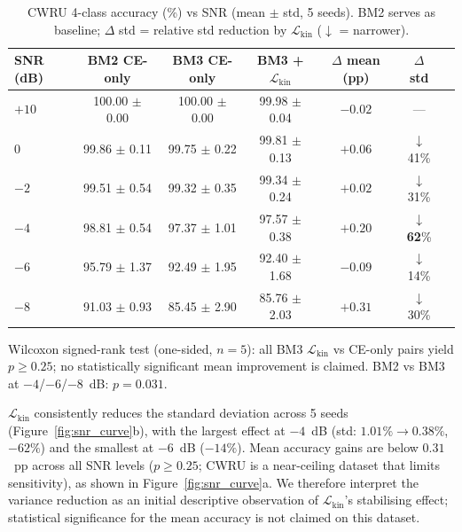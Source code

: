 \begin{table}[htbp]
\centering
\caption{CWRU 4-class accuracy (\%) vs SNR (mean $\pm$ std, 5 seeds).
         BM2 serves as baseline; $\Delta$ std = relative std reduction
         by $\mathcal{L}_{\text{kin}}$ ($\downarrow$ = narrower).}
\label{tab:snr_ablation}
\begin{tabular}{lcccccc}
\toprule
SNR (dB) &
  BM2 CE-only &
  BM3 CE-only &
  BM3 +$\mathcal{L}_{\text{kin}}$ &
  $\Delta$ mean (pp) &
  $\Delta$ std \\
\midrule
$+10$ & 100.00 $\pm$ 0.00 & 100.00 $\pm$ 0.00 & 99.98 $\pm$ 0.04 & $-0.02$ & --- \\
$0$   & 99.86 $\pm$ 0.11  & 99.75 $\pm$ 0.22  & 99.81 $\pm$ 0.13 & $+0.06$ & $\downarrow$41\% \\
$-2$  & 99.51 $\pm$ 0.54  & 99.32 $\pm$ 0.35  & 99.34 $\pm$ 0.24 & $+0.02$ & $\downarrow$31\% \\
$-4$  & 98.81 $\pm$ 0.54  & 97.37 $\pm$ 1.01  & 97.57 $\pm$ 0.38 & $+0.20$ & $\downarrow$\textbf{62}\% \\
$-6$  & 95.79 $\pm$ 1.37  & 92.49 $\pm$ 1.95  & 92.40 $\pm$ 1.68 & $-0.09$ & $\downarrow$14\% \\
$-8$  & 91.03 $\pm$ 0.93  & 85.45 $\pm$ 2.90  & 85.76 $\pm$ 2.03 & $+0.31$ & $\downarrow$30\% \\
\bottomrule
\end{tabular}
\begin{tablenotes}
\item Wilcoxon signed-rank test (one-sided, $n=5$): all BM3 $\mathcal{L}_{\text{kin}}$
      vs CE-only pairs yield $p \geq 0.25$; no statistically significant
      mean improvement is claimed.
      BM2 vs BM3 at $-4$/$-6$/$-8$~dB: $p = 0.031$.
\end{tablenotes}
\end{table}

$\mathcal{L}_{\text{kin}}$ consistently reduces the standard deviation across
5 seeds (Figure~\ref{fig:snr_curve}b), with the largest effect at $-4$~dB
(std: $1.01\% \to 0.38\%$, $-62\%$) and the smallest at $-6$~dB ($-14\%$).
Mean accuracy gains are below $0.31$~pp across all SNR levels ($p \geq 0.25$;
CWRU is a near-ceiling dataset that limits sensitivity), as shown in
Figure~\ref{fig:snr_curve}a.
We therefore interpret the variance reduction as an initial descriptive
observation of $\mathcal{L}_{\text{kin}}$'s stabilising effect; statistical
significance for the mean accuracy is not claimed on this dataset.

